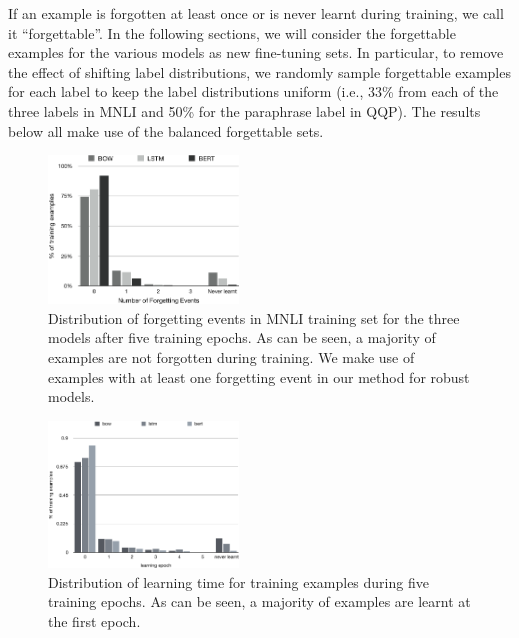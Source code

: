 If an example is forgotten at least once or is never learnt during training, we call it ``forgettable''. %
In the following sections, we will consider the forgettable examples for the various models as new fine-tuning sets. In particular, to remove the effect of shifting label distributions, we randomly sample forgettable examples for each label to keep the label distributions uniform
(i.e., 33\% from each of the three labels in MNLI and 50\% for the paraphrase label in QQP). 
The results below all make use of the balanced forgettable sets.


\begin{figure}[t]
\centering
  \includegraphics[width=0.45\textwidth]{figures/ex_by_forg.png}
  \caption{Distribution of forgetting events in MNLI training set for the three models after five training epochs. As can be seen, a majority of examples are not forgotten during training. We make use of examples 
  with at least one forgetting event in our method for robust models.}
\label{fig:forgcount-freq}
\end{figure}

\iffalse
\begin{figure}[t]
\centering
  \includegraphics[width=0.45\textwidth]{figures/first_learnt_bar_chart.pdf}
  \caption{Distribution of learning time for training examples during five training epochs. As can be seen, a majority of examples are learnt at the first epoch.}
\label{fig:firstlearnt-freq}
\end{figure}

